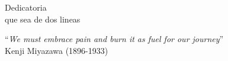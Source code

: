 \thispagestyle{fancy}

\vspace{5cm}
\begin{flushright}
{{\sc Dedicatoria}\\
{\sc que sea de dos lineas}\\}
\end{flushright}

\vspace{12cm}
\begin{centering}
{{``{\it We must embrace pain and burn it as fuel for our journey}''}\\
{\sc Kenji Miyazawa (1896-1933)}\\}
\end{centering}



